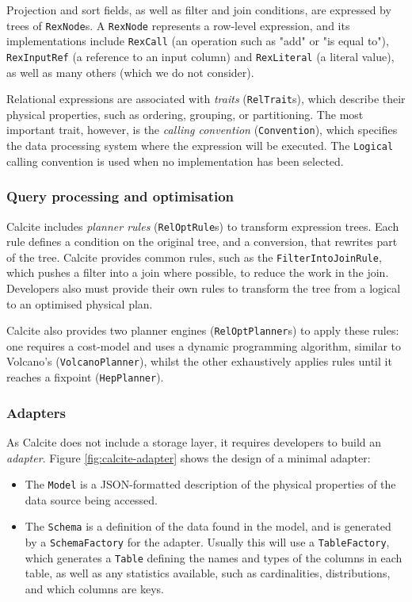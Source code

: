 Projection and sort fields, as well as filter and join conditions, are expressed by trees of \texttt{RexNode}s. A \texttt{RexNode} represents a row-level expression, and its implementations include \texttt{RexCall} (an operation such as "add" or "is equal to"), \texttt{RexInputRef} (a reference to an input column) and \texttt{RexLiteral} (a literal value), as well as many others (which we do not consider).

Relational expressions are associated with \emph{traits} (\texttt{RelTrait}s), which describe their physical properties, such as ordering, grouping, or partitioning. The most important trait, however, is the \emph{calling convention} (\texttt{Convention}), which specifies the data processing system where the expression will be executed. The \texttt{Logical} calling convention is used when no implementation has been selected.

\subsubsection{Query processing and optimisation}

Calcite includes \emph{planner rules} (\texttt{RelOptRule}s) to transform expression trees. Each rule defines a condition on the original tree, and a conversion, that rewrites part of the tree. Calcite provides common rules, such as the \texttt{FilterIntoJoinRule}, which pushes a filter into a join where possible, to reduce the work in the join. Developers also must provide their own rules to transform the tree from a logical to an optimised physical plan.

Calcite also provides two planner engines (\texttt{RelOptPlanner}s) to apply these rules: one requires a cost-model and uses a dynamic programming algorithm, similar to Volcano's \cite{Graefe:1994:VEP:627290.627558} (\texttt{VolcanoPlanner}), whilst the other exhaustively applies rules until it reaches a fixpoint (\texttt{HepPlanner}).

\subsubsection{Adapters}

As Calcite does not include a storage layer, it requires developers to build an \emph{adapter}. Figure \ref{fig:calcite-adapter} shows the design of a minimal adapter:
\begin{itemize}
    \item The \texttt{Model} is a JSON-formatted description of the physical properties of the data source being accessed.
    \item The \texttt{Schema} is a definition of the data found in the model, and is generated by a \texttt{SchemaFactory} for the adapter. Usually this will use a \texttt{TableFactory}, which generates a \texttt{Table} defining the names and types of the columns in each table, as well as any statistics available, such as cardinalities, distributions, and which columns are keys.
\end{itemize}

